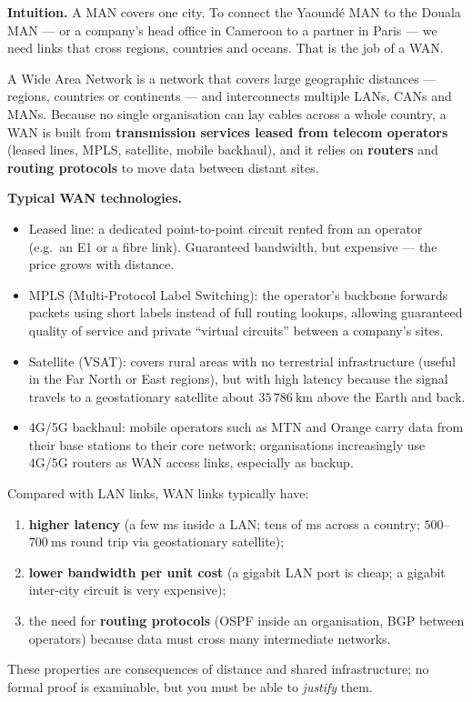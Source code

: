 \documentclass[11pt]{article}
\newcommand{\cle}[1]{{\popxbold\color{popdark}#1}}
\newcounter{popsec}
\newcounter{popsub}
\newcommand{\courssub}[1]{%
  \stepcounter{popsub}%
  \par\vspace{9pt}\noindent{\popxbold\fontsize{11.5}{13}\selectfont\color{popink}{\color{poporange}\thepopsec.\thepopsub}\hspace{6pt}#1}\par\nopagebreak\vspace{4pt}
}
\begin{document}
\courssub{Wide Area Networks (WAN)}

\textbf{Intuition.} A MAN covers one city. To connect the Yaoundé MAN to the Douala MAN — or a company's head office in Cameroon to a partner in Paris — we need links that cross regions, countries and oceans. That is the job of a WAN.

\begin{definition}
A \cle{Wide Area Network} is a network that covers large geographic distances — regions, countries or continents — and interconnects multiple LANs, CANs and MANs. Because no single organisation can lay cables across a whole country, a WAN is built from \textbf{transmission services leased from telecom operators} (leased lines, MPLS, satellite, mobile backhaul), and it relies on \textbf{routers} and \textbf{routing protocols} to move data between distant sites.
\end{definition}

\textbf{Typical WAN technologies.}
\begin{itemize}
\item \cle{Leased line}: a dedicated point-to-point circuit rented from an operator (e.g.\ an E1 or a fibre link). Guaranteed bandwidth, but expensive — the price grows with distance.
\item \cle{MPLS} (Multi-Protocol Label Switching): the operator's backbone forwards packets using short labels instead of full routing lookups, allowing guaranteed quality of service and private ``virtual circuits'' between a company's sites.
\item \cle{Satellite} (VSAT): covers rural areas with no terrestrial infrastructure (useful in the Far North or East regions), but with high latency because the signal travels to a geostationary satellite about $35\,786\ \mathrm{km}$ above the Earth and back.
\item \cle{4G/5G backhaul}: mobile operators such as MTN and Orange carry data from their base stations to their core network; organisations increasingly use 4G/5G routers as WAN access links, especially as backup.
\end{itemize}

\begin{propriete}
Compared with LAN links, WAN links typically have:
\begin{enumerate}
\item \textbf{higher latency} (a few ms inside a LAN; tens of ms across a country; $500$--$700\ \mathrm{ms}$ round trip via geostationary satellite);
\item \textbf{lower bandwidth per unit cost} (a gigabit LAN port is cheap; a gigabit inter-city circuit is very expensive);
\item the need for \textbf{routing protocols} (OSPF inside an organisation, BGP between operators) because data must cross many intermediate networks.
\end{enumerate}
These properties are consequences of distance and shared infrastructure; no formal proof is examinable, but you must be able to \emph{justify} them.
\end{propriete}
\end{document}
